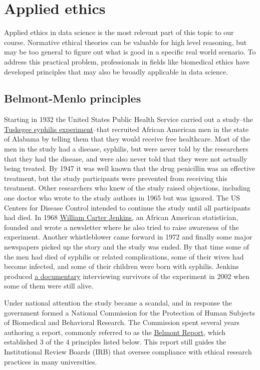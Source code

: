 \documentclass[]{book}
\theoremstyle{definition}
\theoremstyle{definition}
\theoremstyle{definition}
\theoremstyle{remark}
\begin{document}
\section{Applied ethics}\label{applied-ethics}

Applied ethics in data science is the most relevant part of this topic
to our course. Normative ethical theories can be valuable for high level
reasoning, but may be too general to figure out what is good in a
specific real world scenario. To address this practical problem,
professionals in fields like biomedical ethics have developed principles
that may also be broadly applicable in data science.

\subsection{Belmont-Menlo principles}\label{belmont-menlo-principles}

Starting in 1932 the United States Public Health Service carried out a
study--the
\href{https://en.wikipedia.org/wiki/Tuskegee_syphilis_experiment}{Tuskegee
syphilis experiment}--that recruited African American men in the state
of Alabama by telling them that they would receive free healthcare. Most
of the men in the study had a disease, syphilis, but were never told by
the researchers that they had the disease, and were also never told that
they were not actually being treated. By 1947 it was well known that the
drug penicillin was an effective treatment, but the study participants
were prevented from receiving this treatment. Other researchers who knew
of the study raised objections, including one doctor who wrote to the
study authors in 1965 but was ignored. The US Centers for Disease
Control intended to continue the study until all participants had died.
In 1968
\href{https://www.nature.com/articles/d41586-019-00900-9}{William Carter
Jenkins}, an African American statistician, founded and wrote a
newsletter where he also tried to raise awareness of the experiment.
Another whistleblower came forward in 1972 and finally some major
newspapers picked up the story and the study was ended. By that time
some of the men had died of syphilis or related complications, some of
their wives had become infected, and some of their children were born
with syphilis. Jenkins produced \href{https://youtu.be/3e5VfgsGp1k}{a
documentary} interviewing survivors of the experiment in 2002 when some
of them were still alive.

Under national attention the study became a scandal, and in response the
government formed a National Commission for the Protection of Human
Subjects of Biomedical and Behavioral Research. The Commission spent
several years authoring a report, commonly referred to as the
\href{https://en.wikipedia.org/wiki/Belmont_Report}{Belmont Report},
which established 3 of the 4 principles listed below. This report still
guides the Institutional Review Boards (IRB) that oversee compliance
with ethical research practices in many universities.
\end{document}
